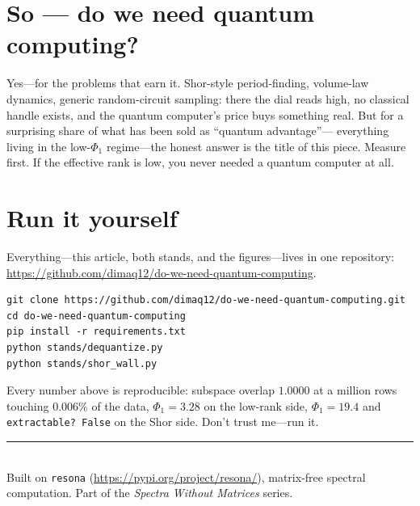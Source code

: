 \documentclass[11pt]{article}
\newcommand{\Phione}{$\Phi_1$}
\begin{document}
\section*{So --- do we need quantum computing?}

Yes---for the problems that earn it. Shor-style period-finding, volume-law
dynamics, generic random-circuit sampling: there the dial reads high, no
classical handle exists, and the quantum computer's price buys something real.
But for a surprising share of what has been sold as ``quantum advantage''---
everything living in the low-\Phione{} regime---the honest answer is the title
of this piece. Measure first. If the effective rank is low, you never needed a
quantum computer at all.

\section*{Run it yourself}

Everything---this article, both stands, and the figures---lives in one repository:
\url{https://github.com/dimaq12/do-we-need-quantum-computing}.

\begin{Verbatim}[fontsize=\small]
git clone https://github.com/dimaq12/do-we-need-quantum-computing.git
cd do-we-need-quantum-computing
pip install -r requirements.txt
python stands/dequantize.py
python stands/shor_wall.py
\end{Verbatim}

Every number above is reproducible: subspace overlap $1.0000$ at a million rows
touching $0.006\%$ of the data, $\Phi_1 = 3.28$ on the low-rank side, $\Phi_1 =
19.4$ and \texttt{extractable? False} on the Shor side. Don't trust me---run it.

\vspace{1em}
\noindent\rule{\linewidth}{0.4pt}\\
\footnotesize Built on \texttt{resona} (\url{https://pypi.org/project/resona/}),
matrix-free spectral computation. Part of the \emph{Spectra Without Matrices}
series.
\end{document}
